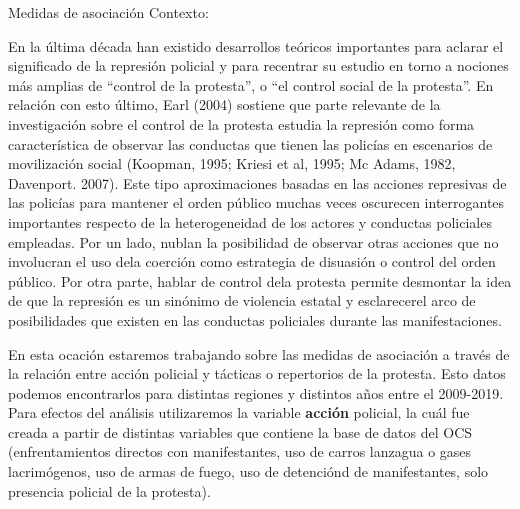 \documentclass[
  8pt,
  ignorenonframetext,
]{beamer}
\begin{document}
\begin{frame}{Medidas de asociación}
\protect\hypertarget{medidas-de-asociaciuxf3n-1}{}
Contexto:

En la última década han existido desarrollos teóricos importantes para
aclarar el significado de la represión policial y para recentrar su
estudio en torno a nociones más amplias de ``control de la protesta'', o
``el control social de la protesta''. En relación con esto último, Earl
(2004) sostiene que parte relevante de la investigación sobre el control
de la protesta estudia la represión como forma característica de
observar las conductas que tienen las policías en escenarios de
movilización social (Koopman, 1995; Kriesi et al, 1995; Mc Adams, 1982,
Davenport. 2007). Este tipo aproximaciones basadas en las acciones
represivas de las policías para mantener el orden público muchas veces
oscurecen interrogantes importantes respecto de la heterogeneidad de los
actores y conductas policiales empleadas. Por un lado, nublan la
posibilidad de observar otras acciones que no involucran el uso dela
coerción como estrategia de disuasión o control del orden público. Por
otra parte, hablar de control dela protesta permite desmontar la idea de
que la represión es un sinónimo de violencia estatal y esclarecerel arco
de posibilidades que existen en las conductas policiales durante las
manifestaciones.

En esta ocación estaremos trabajando sobre las medidas de asociación a
través de la relación entre acción policial y tácticas o repertorios de
la protesta. Esto datos podemos encontrarlos para distintas regiones y
distintos años entre el 2009-2019. Para efectos del análisis
utilizaremos la variable \textbf{acción} policial, la cuál fue creada a
partir de distintas variables que contiene la base de datos del OCS
(enfrentamientos directos con manifestantes, uso de carros lanzagua o
gases lacrimógenos, uso de armas de fuego, uso de detenciónd de
manifestantes, solo presencia policial de la protesta).
\end{frame}
\end{document}
